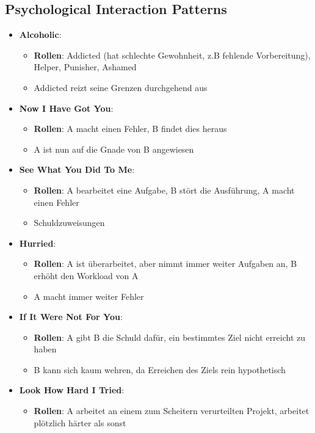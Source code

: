 \subsection{Psychological Interaction Patterns}
\label{rvs:sub:psychological_interaction_patterns}

\begin{itemize}
	\item \textbf{Alcoholic}:
	\begin{itemize}
		\item \textbf{Rollen}: Addicted (hat schlechte Gewohnheit, z.B fehlende Vorbereitung), Helper, Punisher, Ashamed
		\item Addicted reizt seine Grenzen durchgehend aus
	\end{itemize}
	\item \textbf{Now I Have Got You}:
	\begin{itemize}
		\item \textbf{Rollen}: A macht einen Fehler, B findet dies heraus
		\item A ist nun auf die Gnade von B angewiesen
	\end{itemize}
	\item \textbf{See What You Did To Me}:
	\begin{itemize}
		\item \textbf{Rollen}: A bearbeitet eine Aufgabe, B stört die Ausführung, A macht einen Fehler
		\item Schuldzuweisungen
	\end{itemize}
	\item \textbf{Hurried}:
	\begin{itemize}
		\item \textbf{Rollen}: A ist überarbeitet, aber nimmt immer weiter Aufgaben an, B erhöht den Workload von A
		\item A macht immer weiter Fehler
	\end{itemize}
	\item \textbf{If It Were Not For You}:
	\begin{itemize}
		\item \textbf{Rollen}: A gibt B die Schuld dafür, ein bestimmtes Ziel nicht erreicht zu haben
		\item B kann sich kaum wehren, da Erreichen des Ziels rein hypothetisch
	\end{itemize}
	\item \textbf{Look How Hard I Tried}:
	\begin{itemize}
		\item \textbf{Rollen}: A arbeitet an einem zum Scheitern verurteilten Projekt, arbeitet plötzlich härter als sonst

\end{itemize}
\end{itemize}
